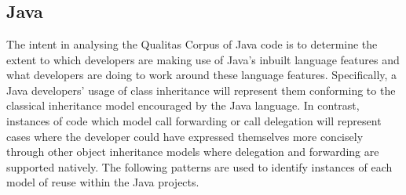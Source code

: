 \documentclass[11pt
              , a4paper
              , twoside
              , openright
              ]{report}
\providecommand{\DIFadd}[1]{{\protect\color{blue}\uwave{#1}}} %
\providecommand{\DIFaddend}{} %
\providecommand{\DIFdelbegin}{} %
\providecommand{\DIFdelend}{} %
\begin{document}
\chapter{\DIFadd{Results}}\label{C:results} 
\DIFaddend \section{Java}
The intent in analysing the Qualitas Corpus of Java code is to determine the extent to which developers are making use of Java's inbuilt language features and what developers are doing to work around these language features. Specifically, a Java developers' usage of class inheritance will represent them conforming to the classical inheritance model encouraged by the Java language. In contrast, instances of code which model call forwarding or call delegation will represent cases where the developer could have expressed themselves more concisely through other object inheritance models where delegation and forwarding are supported natively. The following patterns are used to identify instances of each model of reuse within the Java projects.
\DIFdelbegin %
\DIFdelend 
\end{document}

